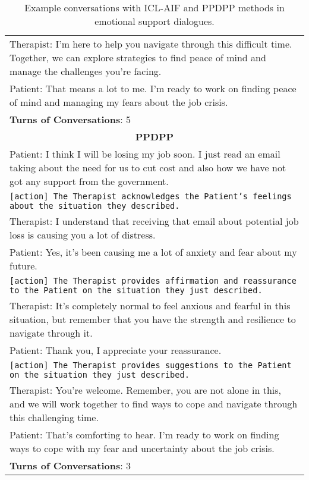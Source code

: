 \begin{table}[]
\begin{tabular}{p{13.5cm}}
    Therapist: I'm here to help you navigate through this difficult time. Together, we can explore strategies to find peace of mind and manage the challenges you're facing.\\
    Patient: That means a lot to me. I'm ready to work on finding peace of mind and managing my fears about the job crisis.\\
    \midrule
    \textbf{Turns of Conversations}: 5 \\
    \midrule
    \midrule
    \multicolumn{1}{c}{\textsc{\textbf{PPDPP}}}\\
    \midrule
    Patient: I think I will be losing my job soon. I just read an email taking about the need for us to cut cost and also how we have not got any support from the government.\\
    \texttt{[action] The Therapist acknowledges the Patient’s feelings about the situation they described.} \\
    Therapist: I understand that receiving that email about potential job loss is causing you a lot of distress.\\
    Patient: Yes, it's been causing me a lot of anxiety and fear about my future.\\
    \texttt{[action] The Therapist provides affirmation and reassurance to the Patient on the situation they just described.} \\
    Therapist: It's completely normal to feel anxious and fearful in this situation, but remember that you have the strength and resilience to navigate through it.\\
    Patient: Thank you, I appreciate your reassurance.\\
    \texttt{[action] The Therapist provides suggestions to the Patient on the situation they just described.} \\
    Therapist: You're welcome. Remember, you are not alone in this, and we will work together to find ways to cope and navigate through this challenging time.\\
    Patient: That's comforting to hear. I'm ready to work on finding ways to cope with my fear and uncertainty about the job crisis.\\
    \midrule
    \textbf{Turns of Conversations}: 3 \\
    \bottomrule
    \end{tabular}
    \caption{Example conversations with ICL-AIF and PPDPP methods in emotional support dialogues. }
    \label{tab:esc_case_4}
\end{table}